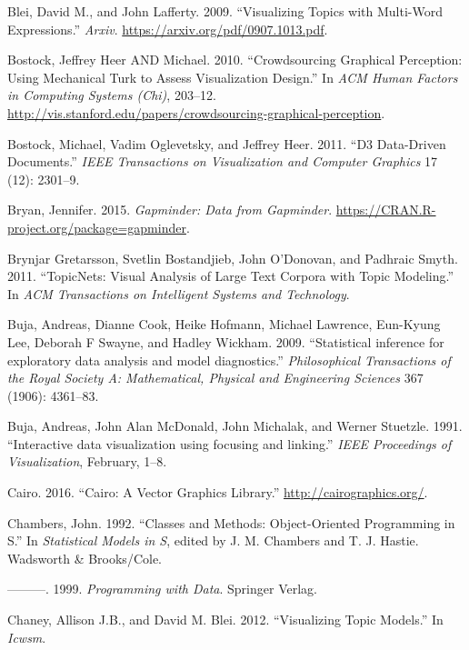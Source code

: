 \documentclass[12pt,]{isuthesis}
\begin{document}
\hypertarget{ref-Blei-2009}{}
Blei, David M., and John Lafferty. 2009. ``Visualizing Topics with
Multi-Word Expressions.'' \emph{Arxiv}.
\url{https://arxiv.org/pdf/0907.1013.pdf}.

\hypertarget{ref-crowdsourcing-graphical-perception}{}
Bostock, Jeffrey Heer AND Michael. 2010. ``Crowdsourcing Graphical
Perception: Using Mechanical Turk to Assess Visualization Design.'' In
\emph{ACM Human Factors in Computing Systems (Chi)}, 203--12.
\url{http://vis.stanford.edu/papers/crowdsourcing-graphical-perception}.

\hypertarget{ref-d3}{}
Bostock, Michael, Vadim Oglevetsky, and Jeffrey Heer. 2011. ``D3
Data-Driven Documents.'' \emph{IEEE Transactions on Visualization and
Computer Graphics} 17 (12): 2301--9.

\hypertarget{ref-gapminder}{}
Bryan, Jennifer. 2015. \emph{Gapminder: Data from Gapminder}.
\url{https://CRAN.R-project.org/package=gapminder}.

\hypertarget{ref-Gretarsson}{}
Brynjar Gretarsson, Svetlin Bostandjieb, John O'Donovan, and Padhraic
Smyth. 2011. ``TopicNets: Visual Analysis of Large Text Corpora with
Topic Modeling.'' In \emph{ACM Transactions on Intelligent Systems and
Technology}.

\hypertarget{ref-Buja:2009hp}{}
Buja, Andreas, Dianne Cook, Heike Hofmann, Michael Lawrence, Eun-Kyung
Lee, Deborah F Swayne, and Hadley Wickham. 2009. ``Statistical inference
for exploratory data analysis and model diagnostics.''
\emph{Philosophical Transactions of the Royal Society A: Mathematical,
Physical and Engineering Sciences} 367 (1906): 4361--83.

\hypertarget{ref-Buja:1991vh}{}
Buja, Andreas, John Alan McDonald, John Michalak, and Werner Stuetzle.
1991. ``Interactive data visualization using focusing and linking.''
\emph{IEEE Proceedings of Visualization}, February, 1--8.

\hypertarget{ref-cairo}{}
Cairo. 2016. ``Cairo: A Vector Graphics Library.''
\url{http://cairographics.org/}.

\hypertarget{ref-S3}{}
Chambers, John. 1992. ``Classes and Methods: Object-Oriented Programming
in S.'' In \emph{Statistical Models in S}, edited by J. M. Chambers and
T. J. Hastie. Wadsworth \& Brooks/Cole.

\hypertarget{ref-Chambers:1999}{}
---------. 1999. \emph{Programming with Data}. Springer Verlag.

\hypertarget{ref-Blei-2012}{}
Chaney, Allison J.B., and David M. Blei. 2012. ``Visualizing Topic
Models.'' In \emph{Icwsm}.
\end{document}
